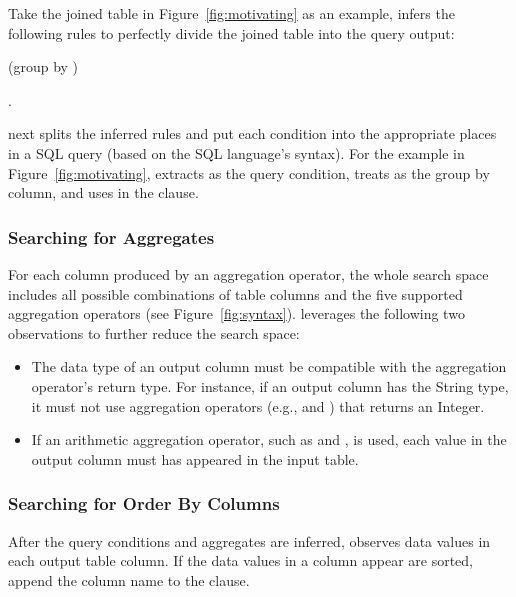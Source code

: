 Take the joined table in Figure~\ref{fig:motivating} as an example, \ourtool
infers the following rules to perfectly divide the joined table into
the query output:

\smallskip
{
 (group by  )
}

.

\ourtool next splits the inferred rules and put each condition
into the appropriate places in a SQL query (based on the SQL language's
syntax). For the example in Figure~\ref{fig:motivating}, \ourtool
extracts  as the query
condition, treats  as the group by column,
and uses 
in the  clause.





\subsubsection{Searching for Aggregates}
\label{sec:agg_search}

For each column produced by an aggregation operator,
the whole search space includes all possible combinations
of table columns and the five supported aggregation operators (see Figure~\ref{fig:syntax}).
\ourtool leverages the following two observations to
further reduce the search space:

\begin{itemize}
\item The data type of an output column must be compatible with the
aggregation operator's return type. For instance, if an output column
has the String type, it must not use aggregation operators (e.g.,
 and ) that returns
an Integer. 

\item If an arithmetic aggregation operator, such as  and ,
is used, each value in the output column must has appeared in the input table.
\end{itemize}


\subsubsection{Searching for Order By Columns}
\label{sec:orderby}

After the query conditions and aggregates are inferred,
\ourtool observes data values in each output table column. If
the data values in a column appear are sorted, \ourtool
append the column name to the  clause.
